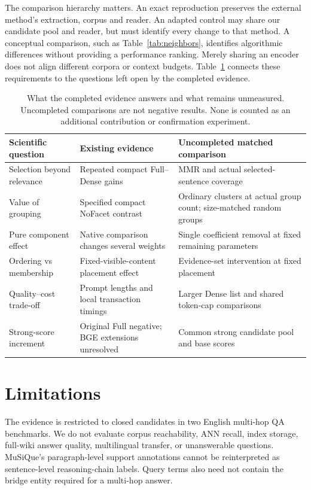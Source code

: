 \documentclass[11pt,a4paper]{article}
\begin{document}
The comparison hierarchy matters. An exact reproduction preserves the
external method's extraction, corpus and reader. An adapted control may
share our candidate pool and reader, but must identify every change to that
method. A conceptual comparison, such as Table~\ref{tab:neighbors}, identifies
algorithmic differences without providing a performance ranking. Merely
sharing an encoder does not align different corpora or context budgets.
Table~\ref{tab:remaining} connects these requirements to the questions left
open by the completed evidence.

\begin{table}[t]
\centering\small
\begin{tabular}{@{}p{}p{}p{}@{}}
\toprule
Scientific question & Existing evidence & Uncompleted matched comparison\\
\midrule
Selection beyond relevance & Repeated compact Full--Dense gains & MMR and actual selected-sentence coverage\\
Value of grouping & Specified compact NoFacet contrast & Ordinary clusters at actual group count; size-matched random groups\\
Pure component effect & Native comparison changes several weights & Single coefficient removal at fixed remaining parameters\\
Ordering vs membership & Fixed-visible-content placement effect & Evidence-set intervention at fixed placement\\
Quality--cost trade-off & Prompt lengths and local transaction timings & Larger Dense list and shared token-cap comparisons\\
Strong-score increment & Original Full negative; BGE extensions unresolved & Common strong candidate pool and base scores\\
\bottomrule
\end{tabular}
\caption{What the completed evidence answers and what remains unmeasured.
Uncompleted comparisons are not negative results. None is counted as an
additional contribution or confirmation experiment.}
\label{tab:remaining}
\end{table}

\section{Limitations}
The evidence is restricted to closed candidates in two English multi-hop QA
benchmarks. We do not evaluate corpus reachability, ANN recall, index
storage, full-wiki answer quality, multilingual transfer, or unanswerable
questions. MuSiQue's paragraph-level support annotations cannot be
reinterpreted as sentence-level reasoning-chain labels. Query terms also
need not contain the bridge entity required for a multi-hop answer.
\end{document}
